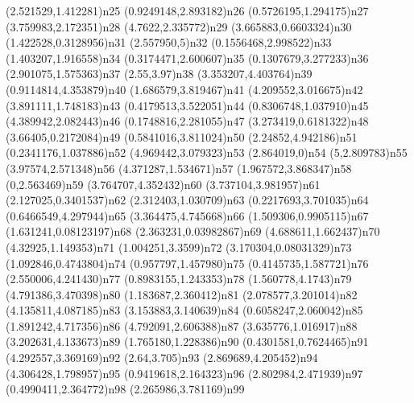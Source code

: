 \dotnode[](2.521529,1.412281){n25}
\dotnode[](0.9249148,2.893182){n26}
\dotnode[](0.5726195,1.294175){n27}
\dotnode[](3.759983,2.172351){n28}
\dotnode[](4.7622,2.335772){n29}
\dotnode[](3.665883,0.6603324){n30}
\dotnode[](1.422528,0.3128956){n31}
\dotnode[](2.557950,5){n32}
\dotnode[](0.1556468,2.998522){n33}
\dotnode[](1.403207,1.916558){n34}
\dotnode[](0.3174471,2.600607){n35}
\dotnode[](0.1307679,3.277233){n36}
\dotnode[](2.901075,1.575363){n37}
\dotnode[](2.55,3.97){n38}
\dotnode[](3.353207,4.403764){n39}
\dotnode[](0.9114814,4.353879){n40}
\dotnode[](1.686579,3.819467){n41}
\dotnode[](4.209552,3.016675){n42}
\dotnode[](3.891111,1.748183){n43}
\dotnode[](0.4179513,3.522051){n44}
\dotnode[](0.8306748,1.037910){n45}
\dotnode[](4.389942,2.082443){n46}
\dotnode[](0.1748816,2.281055){n47}
\dotnode[](3.273419,0.6181322){n48}
\dotnode[](3.66405,0.2172084){n49}
\dotnode[](0.5841016,3.811024){n50}
\dotnode[](2.24852,4.942186){n51}
\dotnode[](0.2341176,1.037886){n52}
\dotnode[](4.969442,3.079323){n53}
\dotnode[](2.864019,0){n54}
\dotnode[](5,2.809783){n55}
\dotnode[](3.97574,2.571348){n56}
\dotnode[](4.371287,1.534671){n57}
\dotnode[](1.967572,3.868347){n58}
\dotnode[](0,2.563469){n59}
\dotnode[](3.764707,4.352432){n60}
\dotnode[](3.737104,3.981957){n61}
\dotnode[](2.127025,0.3401537){n62}
\dotnode[](2.312403,1.030709){n63}
\dotnode[](0.2217693,3.701035){n64}
\dotnode[](0.6466549,4.297944){n65}
\dotnode[](3.364475,4.745668){n66}
\dotnode[](1.509306,0.9905115){n67}
\dotnode[](1.631241,0.08123197){n68}
\dotnode[](2.363231,0.03982867){n69}
\dotnode[](4.688611,1.662437){n70}
\dotnode[](4.32925,1.149353){n71}
\dotnode[](1.004251,3.3599){n72}
\dotnode[](3.170304,0.08031329){n73}
\dotnode[](1.092846,0.4743804){n74}
\dotnode[](0.957797,1.457980){n75}
\dotnode[](0.4145735,1.587721){n76}
\dotnode[](2.550006,4.241430){n77}
\dotnode[](0.8983155,1.243353){n78}
\dotnode[](1.560778,4.1743){n79}
\dotnode[](4.791386,3.470398){n80}
\dotnode[](1.183687,2.360412){n81}
\dotnode[](2.078577,3.201014){n82}
\dotnode[](4.135811,4.087185){n83}
\dotnode[](3.153883,3.140639){n84}
\dotnode[](0.6058247,2.060042){n85}
\dotnode[](1.891242,4.717356){n86}
\dotnode[](4.792091,2.606388){n87}
\dotnode[](3.635776,1.016917){n88}
\dotnode[](3.202631,4.133673){n89}
\dotnode[](1.765180,1.228386){n90}
\dotnode[](0.4301581,0.7624465){n91}
\dotnode[](4.292557,3.369169){n92}
\dotnode[](2.64,3.705){n93}
\dotnode[](2.869689,4.205452){n94}
\dotnode[](4.306428,1.798957){n95}
\dotnode[](0.9419618,2.164323){n96}
\dotnode[](2.802984,2.471939){n97}
\dotnode[](0.4990411,2.364772){n98}
\dotnode[](2.265986,3.781169){n99}
